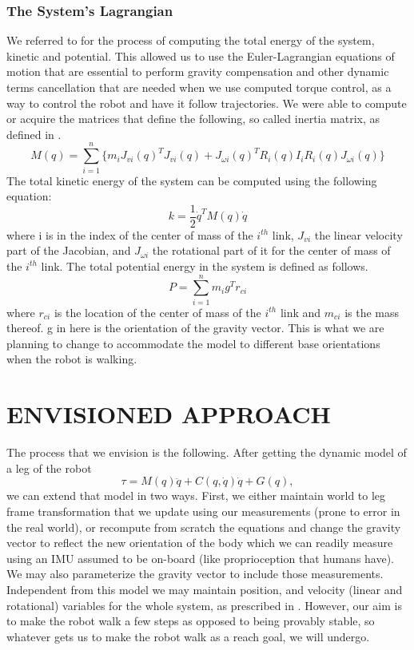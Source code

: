 \subsubsection{The System's Lagrangian}
We referred to \cite{spong2006robot} for the process of computing the total energy of the system, kinetic and potential. This allowed us to use the Euler-Lagrangian equations of motion that are essential to perform gravity compensation and other dynamic terms cancellation that are needed when we use computed torque control, as a way to control the robot and have it follow trajectories.
We were able to compute or acquire the matrices that define the following, so called inertia matrix, as defined in \cite{spong2006robot}.
$$
M(q) = \sum_{i=1}^n \{m_i J_{vi}(q)^T J_{vi}(q) + J_{\omega i}(q)^T R_i(q) I_i R_i(q) J_{\omega i}(q)\}
$$
The total kinetic energy of the system can be computed using the following equation:
$$
k = \frac{1}{2} \dot{q}^T M(q)\dot{q}
$$
where i is in the index of the center of mass of the $i^{th}$ link, $J_{vi}$ the linear velocity part of the Jacobian, and  $J_{\omega i}$ the rotational part of it for the center of mass of the $i^{th}$ link.
The total potential energy in the system is defined as follows.
$$
P = \sum_{i=1}^n  m_i g^T r_{ci}
$$
where $r_{ci}$ is the location of the center of mass of the $i^{th}$ link and $m_{ci}$ is the mass thereof. g in here is the orientation of the gravity vector. This is what we are planning to change to accommodate the model to different base orientations when the robot is walking.

\section{ENVISIONED APPROACH}
The process that we envision is the following. After getting the dynamic model of a leg of the robot
$$
\tau = M(q)\ddot{q} + C(q,\dot{q})\dot{q} + G(q),
$$ we can extend that model in two ways.
First, we either maintain world to leg frame transformation that we update using our measurements (prone to error in the real world), or recompute from scratch the equations and change the gravity vector to reflect the new orientation of the body which we can readily measure using an IMU assumed to be on-board (like proprioception that humans have). We may also parameterize the gravity vector to include those measurements. Independent from this model we may maintain position, and velocity (linear and rotational) variables for the whole system, as prescribed in \cite{hardt2003dynamic}. However, our aim is to make the robot walk a few steps as opposed to being provably stable, so whatever gets us to make the robot walk as a reach goal, we will undergo.

